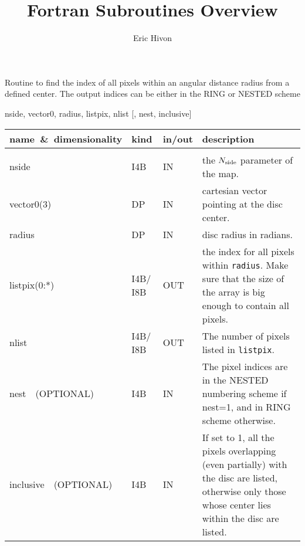 
\sloppy


\title{\healpix Fortran Subroutines Overview}
 \section[query\_disc]{ }
\label{sub:query_disc}
\author{Eric Hivon}

\begin{facility}
{Routine to find the index of all pixels within an angular distance radius from a defined
center. The output indices can be either in the RING or NESTED scheme} 
{\modPixTools}
\end{facility}

\begin{f90format}
{nside, vector0, radius, listpix, nlist [, nest, inclusive]}
\end{f90format}

\begin{arguments}
{
\begin{tabular}{p{0.28\hsize} p{0.05\hsize} p{0.1\hsize} p{0.47\hsize}} \hline 
\textbf{name~\&~dimensionality} & \textbf{kind} & \textbf{in/out} & \textbf{description} \\ \hline
                   &   &   &                           \\ %
nside & I4B & IN & the ${N_{\rm side}}$ parameter of the map. \\
vector0(3) & DP & IN & cartesian vector pointing at the disc center. \\
radius & DP & IN & disc radius in radians. \\
listpix(0:*) & I4B/ I8B & OUT & the index for all pixels within {\tt radius}. Make sure that the size of the array is big enough to contain all pixels. \\ 
nlist & I4B/ I8B & OUT & The number of pixels listed in {\tt listpix}. \\
nest\ \ (OPTIONAL) & I4B & IN &  The pixel indices are in the NESTED numbering
                   scheme if nest=1, and in RING scheme otherwise. \\
inclusive\ \ (OPTIONAL) & I4B & IN & If set to 1, all the pixels overlapping
                   (even partially)
                   with the disc are listed, otherwise only those whose
                   center lies within the disc are listed. \\

\end{tabular}
}
\end{arguments}


